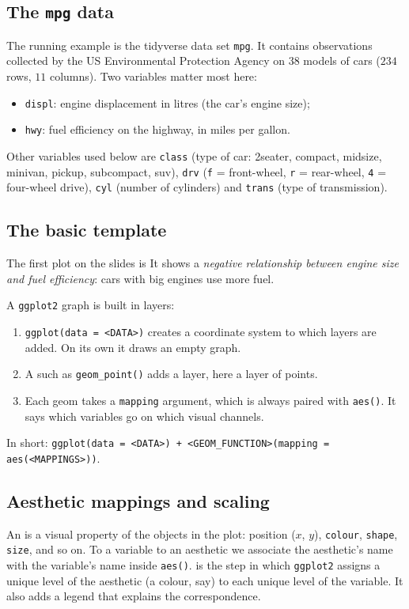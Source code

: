 \subsection{The \texttt{mpg} data}
The running example is the tidyverse data set \texttt{mpg}. It contains observations collected
by the US Environmental Protection Agency on $38$ models of cars ($234$ rows, $11$ columns).
Two variables matter most here:
\begin{itemize}
  \item \texttt{displ}: engine displacement in litres (the car's engine size);
  \item \texttt{hwy}: fuel efficiency on the highway, in miles per gallon.
\end{itemize}
Other variables used below are \texttt{class} (type of car: 2seater, compact, midsize, minivan,
pickup, subcompact, suv), \texttt{drv} (\texttt{f} = front-wheel, \texttt{r} = rear-wheel,
\texttt{4} = four-wheel drive), \texttt{cyl} (number of cylinders) and \texttt{trans} (type of
transmission).

\subsection{The basic template}
The first plot on the slides is
It shows a \emph{negative relationship between engine size and fuel efficiency}: cars with big
engines use more fuel.

\begin{definition}\label{def:L02-template}
A \texttt{ggplot2} graph is built in layers:
\begin{enumerate}
  \item \texttt{ggplot(data = <DATA>)} creates a coordinate system to which layers are added. On its own it draws an empty graph.
  \item A  such as \texttt{geom\_point()} adds a layer, here a layer of points.
  \item Each geom takes a \texttt{mapping} argument, which is always paired with \texttt{aes()}. It says which variables go on which visual channels.
\end{enumerate}
In short: \texttt{ggplot(data = <DATA>) + <GEOM\_FUNCTION>(mapping = aes(<MAPPINGS>))}.
\end{definition}

\subsection{Aesthetic mappings and scaling}
\begin{definition}\label{def:L02-aes}
An  is a visual property of the objects in the plot: position ($x$, $y$),
\texttt{colour}, \texttt{shape}, \texttt{size}, and so on. To  a variable to an
aesthetic we associate the aesthetic's name with the variable's name inside \texttt{aes()}.
 is the step in which \texttt{ggplot2} assigns a unique level of the aesthetic
(a colour, say) to each unique level of the variable. It also adds a legend that explains the
correspondence.
\end{definition}

